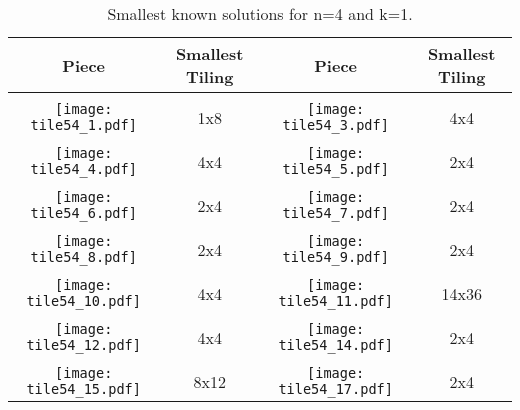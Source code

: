 \documentclass[10pt,a4paper]{article}
\theoremstyle{definition}
\begin{document}
\begin{table}[!htpb]
\centering
\begin{tabular}{|c|c|c|c|}
\hline
Piece & Smallest Tiling & Piece & Smallest Tiling\\ \hline
& & & \\ 
\texttt{[image: tile54\_1.pdf]} & 1x8 & \texttt{[image: tile54\_3.pdf]} & 4x4 \\ \hline
& & & \\ 
\texttt{[image: tile54\_4.pdf]} & 4x4 & \texttt{[image: tile54\_5.pdf]} & 2x4 \\ \hline
& & & \\ 
\texttt{[image: tile54\_6.pdf]} & 2x4 & \texttt{[image: tile54\_7.pdf]} & 2x4 \\ \hline
& & & \\ 
\texttt{[image: tile54\_8.pdf]} & 2x4 & \texttt{[image: tile54\_9.pdf]} & 2x4 \\ \hline
& & & \\ 
\texttt{[image: tile54\_10.pdf]} & 4x4 & \texttt{[image: tile54\_11.pdf]} & 14x36 \\ \hline
& & & \\ 
\texttt{[image: tile54\_12.pdf]} & 4x4 & \texttt{[image: tile54\_14.pdf]} & 2x4 \\ \hline
& & & \\ 
\texttt{[image: tile54\_15.pdf]} & 8x12 & \texttt{[image: tile54\_17.pdf]} & 2x4 \\ \hline
\end{tabular}
\caption{Smallest known solutions for n=4 and k=1.}
\label{tab:trivial-41}
\end{table}
\end{document}
